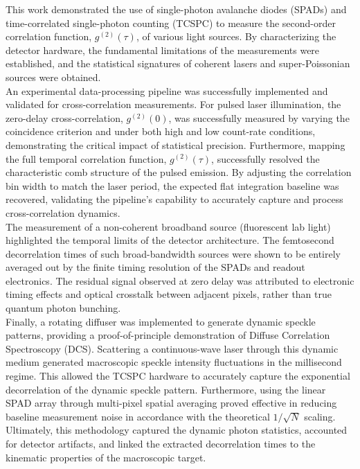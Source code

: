 This work demonstrated the use of single-photon avalanche diodes (SPADs) and time-correlated single-photon counting (TCSPC) to measure the second-order correlation function, $g^{(2)}(\tau)$, of various light sources. 
By characterizing the detector hardware, the fundamental limitations of the measurements were established, and the statistical signatures of coherent lasers and super-Poissonian sources were obtained. \\

An experimental data-processing pipeline was successfully implemented and validated for cross-correlation measurements.
For pulsed laser illumination, the zero-delay cross-correlation, $g^{(2)}(0)$, was successfully measured by varying the coincidence criterion and under both high and low count-rate conditions, demonstrating the critical impact of statistical precision. 
Furthermore, mapping the full temporal correlation function, $g^{(2)}(\tau)$, successfully resolved the characteristic comb structure of the pulsed emission. 
By adjusting the correlation bin width to match the laser period, the expected flat integration baseline was recovered, validating the pipeline's capability to accurately capture and process cross-correlation dynamics. \\

The measurement of a non-coherent broadband source (fluorescent lab light) highlighted the temporal limits of the detector architecture. 
The femtosecond decorrelation times of such broad-bandwidth sources were shown to be entirely averaged out by the finite timing resolution of the SPADs and readout electronics. 
The residual signal observed at zero delay was attributed to electronic timing effects and optical crosstalk between adjacent pixels, rather than true quantum photon bunching. \\

Finally, a rotating diffuser was implemented to generate dynamic speckle patterns, providing a proof-of-principle demonstration of Diffuse Correlation Spectroscopy (DCS).
Scattering a continuous-wave laser through this dynamic medium generated macroscopic speckle intensity fluctuations in the millisecond regime. 
This allowed the TCSPC hardware to accurately capture the exponential decorrelation of the dynamic speckle pattern.
Furthermore, using the linear SPAD array through multi-pixel spatial averaging proved effective in reducing baseline measurement noise in accordance with the theoretical $1/\sqrt{N}$ scaling. 
Ultimately, this methodology captured the dynamic photon statistics, accounted for detector artifacts, and linked the extracted decorrelation times to the kinematic properties of the macroscopic target.